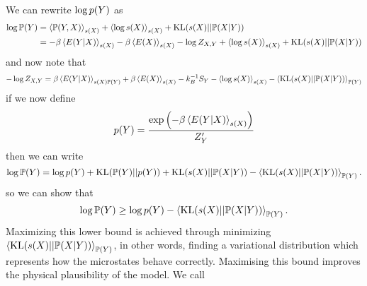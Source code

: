 \documentclass[]{article}
\begin{document}
We can rewrite $\log p(Y)$ as
\begin{align}
    \log \mathbb{P}(Y) & =
    \left\langle \mathbb{P}(Y,
      X) \right\rangle_{s(X )} + \left\langle \log
      s(X) \right\rangle_{s(X)} +
    \text{KL}(s(X)||\mathbb{P}(X|Y))
    \nonumber \\ & = -\beta\left\langle  E(Y |
      X) \right\rangle_{s(X)}
    -\beta\left\langle E(X) \right\rangle_{s(X)} -
    \log Z_{X,Y} + \left\langle \log
      s(X) \right\rangle_{s(X)} +
    \text{KL}(s(X)||\mathbb{P}(X|Y)) \label{eqn-true-log-likelihood-1}
\end{align}
and now note that
\[
- \log Z_{X,Y} =
\beta\left\langle E(Y |
  X) \right\rangle_{s(X)\mathbb{P}(Y)}
+ \beta\left\langle E(X) \right\rangle_{s(X )} -
k_B^{-1}S_Y -\left\langle \log
  s(X) \right\rangle_{s(X)} -
\left\langle \text{KL}(s(X) ||
  \mathbb{P}(X |
  Y)) \right\rangle_{\mathbb{P}(Y)}
\]
if we now define
\[
p(Y) = \frac{\exp\left(-\beta
  \left\langle E(Y |
    X) \right\rangle_{s(X)}\right)}{Z^\prime_Y}
\]
then we can write
\[
\log \mathbb{P}(Y) = \log p(Y) +
\text{KL}(\mathbb{P}(Y)||p(Y)) +
\text{KL}(s(X)||\mathbb{P}(X|Y))
-
\left\langle \text{KL}(s(X)||\mathbb{P}(X|Y)) \right\rangle_{\mathbb{P}(Y)}.
\]
so we can show that
\[
\log \mathbb{P}(Y) \geq \log p(Y)
-
\left\langle \text{KL}(s(X)||\mathbb{P}(X|Y)) \right\rangle_{\mathbb{P}(Y)}.
\]
Maximizing this lower bound is achieved through minimizing
$\left\langle \text{KL}(s(X)||\mathbb{P}(X|Y)) \right\rangle_{\mathbb{P}(Y)}$,
in other words, finding a variational distribution which represents
how the microstates behave correctly. Maximising this bound improves
the physical plausibility of the model. We call
\end{document}
